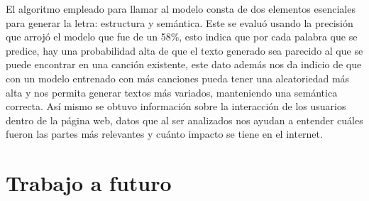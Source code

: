 \documentclass[12pt, a4paper, titlepage]{report}
\begin{document}
El algoritmo empleado para llamar al modelo consta de dos elementos esenciales para generar la letra: estructura y semántica. Este se evaluó usando la precisión que arrojó el modelo que fue de un 58\%, esto indica que por cada palabra que se predice, hay una probabilidad alta de que el texto generado sea parecido al que se puede encontrar en una canción existente, este dato además nos da indicio de que con un modelo entrenado con más canciones pueda tener una aleatoriedad más alta y nos permita generar textos más variados, manteniendo una semántica correcta. 
Así mismo se obtuvo información sobre la interacción de los usuarios dentro de la página web, datos que al ser analizados nos ayudan a entender cuáles fueron las partes más relevantes y cuánto impacto se tiene en el internet.
\newpage
\chapter{\textcolor{azulescom}{Trabajo a futuro}}
\end{document}
